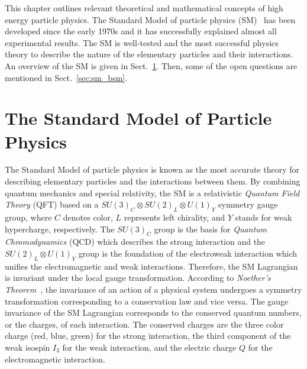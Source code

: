 This chapter outlines relevant theoretical and mathematical concepts of high energy particle physics.
The Standard Model of particle physics (SM)~\cite{Salam:1968rm, Glashow:1961tr, Weinberg:1967tq, Herrero:1998eq, Cottingham:2007zz} has been developed since the early 1970s and it has successfully explained almost all experimental results.
The SM is well-tested and the most successful physics theory to describe the nature of the elementary particles and their interactions.
An overview of the SM is given in Sect.~\ref{sec:sm}.
Then, some of the open questions are mentioned in Sect.~\ref{sec:sm_bsm}.


\section{The Standard Model of Particle Physics}
\label{sec:sm}
The Standard Model of particle physics is known as the most accurate theory for describing elementary particles and the interactions between them.
By combining quantum mechanics and special relativity, the SM is a relativistic \textit{Quantum Field Theory} (QFT) based on a $SU(3)_{C} \otimes SU(2)_{L} \otimes U(1)_{Y}$ symmetry gauge group, where $C$ denotes color, $L$ represents left chirality, and $Y$ stands for weak hypercharge, respectively.
The $SU(3)_{C}$ group is the basis for \textit{Quantum Chromodynamics} (QCD) which describes the strong interaction and the $SU(2)_{L} \otimes U(1)_{Y}$ group is the foundation of the electroweak interaction which unifies the electromagnetic and weak interactions.
Therefore, the SM Lagrangian is invariant under the local gauge transformation.
According to \textit{Noether's Theorem}~\cite{Noether:1918zz}, the invariance of an action of a physical system undergoes a symmetry transformation corresponding to a conservation law and vice versa. 
The gauge invariance of the SM Lagrangian corresponds to the conserved quantum numbers, or the charges, of each interaction.
The conserved charges are the three color charge (red, blue, green) for the strong interaction, the third component of the weak isospin $I_{3}$ for the weak interaction, and the electric charge $Q$ for the electromagnetic interaction.


